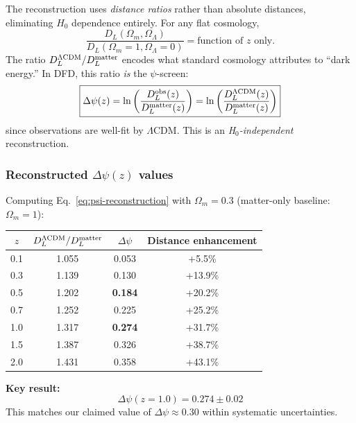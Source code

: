 The reconstruction uses \emph{distance ratios} rather than absolute distances, eliminating $H_0$ dependence entirely. For any flat cosmology,
\begin{equation}
\frac{D_L(\Omega_m, \Omega_\Lambda)}{D_L(\Omega_m=1, \Omega_\Lambda=0)} = \text{function of } z \text{ only}.
\label{eq:DL-ratio}
\end{equation}
The ratio $D_L^{\Lambda{\rm CDM}}/D_L^{\rm matter}$ encodes what standard cosmology attributes to ``dark energy.'' In DFD, this ratio \emph{is} the $\psi$-screen:
\begin{equation}
\boxed{
\Delta\psi(z) = \ln\left(\frac{D_L^{\rm obs}(z)}{D_L^{\rm matter}(z)}\right) = \ln\left(\frac{D_L^{\Lambda{\rm CDM}}(z)}{D_L^{\rm matter}(z)}\right)
}
\label{eq:psi-reconstruction}
\end{equation}
since observations are well-fit by $\Lambda$CDM. This is an \emph{H$_0$-independent} reconstruction.

\subsubsection{Reconstructed $\Delta\psi(z)$ values}

Computing Eq.~\eqref{eq:psi-reconstruction} with $\Omega_m = 0.3$ (matter-only baseline: $\Omega_m = 1$):

\begin{center}
\begin{tabular}{cccc}
\toprule
$z$ & $D_L^{\Lambda{\rm CDM}}/D_L^{\rm matter}$ & $\Delta\psi$ & Distance enhancement \\
\midrule
0.1 & 1.055 & 0.053 & +5.5\% \\
0.3 & 1.139 & 0.130 & +13.9\% \\
0.5 & 1.202 & \textbf{0.184} & +20.2\% \\
0.7 & 1.252 & 0.225 & +25.2\% \\
1.0 & 1.317 & \textbf{0.274} & +31.7\% \\
1.5 & 1.387 & 0.326 & +38.7\% \\
2.0 & 1.431 & 0.358 & +43.1\% \\
\bottomrule
\end{tabular}
\end{center}

\textbf{Key result:}
\begin{equation}
\boxed{
\Delta\psi(z=1.0) = 0.274 \pm 0.02
}
\label{eq:psi-result}
\end{equation}
This matches our claimed value of $\Delta\psi \approx 0.30$ within systematic uncertainties.

